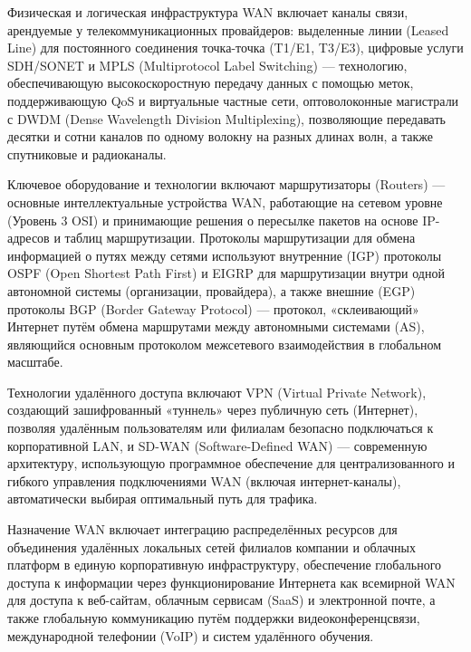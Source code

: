 \documentclass{SibFU-docs}
\begin{document}

Физическая и логическая инфраструктура WAN включает каналы связи, арендуемые у телекоммуникационных провайдеров: выделенные линии (Leased Line) для постоянного соединения точка-точка (T1/E1, T3/E3), цифровые услуги SDH/SONET и MPLS (Multiprotocol Label Switching) --- технологию, обеспечивающую высокоскоростную передачу данных с помощью меток, поддерживающую QoS и виртуальные частные сети, оптоволоконные магистрали с DWDM (Dense Wavelength Division Multiplexing), позволяющие передавать десятки и сотни каналов по одному волокну на разных длинах волн, а также спутниковые и радиоканалы.

Ключевое оборудование и технологии включают маршрутизаторы (Routers) --- основные интеллектуальные устройства WAN, работающие на сетевом уровне (Уровень 3 OSI) и принимающие решения о пересылке пакетов на основе IP-адресов и таблиц маршрутизации. Протоколы маршрутизации для обмена информацией о путях между сетями используют внутренние (IGP) протоколы OSPF (Open Shortest Path First) и EIGRP для маршрутизации внутри одной автономной системы (организации, провайдера), а также внешние (EGP) протоколы BGP (Border Gateway Protocol) --- протокол, «склеивающий» Интернет путём обмена маршрутами между автономными системами (AS), являющийся основным протоколом межсетевого взаимодействия в глобальном масштабе.

Технологии удалённого доступа включают VPN (Virtual Private Network), создающий зашифрованный «туннель» через публичную сеть (Интернет), позволяя удалённым пользователям или филиалам безопасно подключаться к корпоративной LAN, и SD-WAN (Software-Defined WAN) --- современную архитектуру, использующую программное обеспечение для централизованного и гибкого управления подключениями WAN (включая интернет-каналы), автоматически выбирая оптимальный путь для трафика.


Назначение WAN включает интеграцию распределённых ресурсов для объединения удалённых локальных сетей филиалов компании и облачных платформ в единую корпоративную инфраструктуру, обеспечение глобального доступа к информации через функционирование Интернета как всемирной WAN для доступа к веб-сайтам, облачным сервисам (SaaS) и электронной почте, а также глобальную коммуникацию путём поддержки видеоконференцсвязи, международной телефонии (VoIP) и систем удалённого обучения.

\vspace{1.5em}
\end{document}
